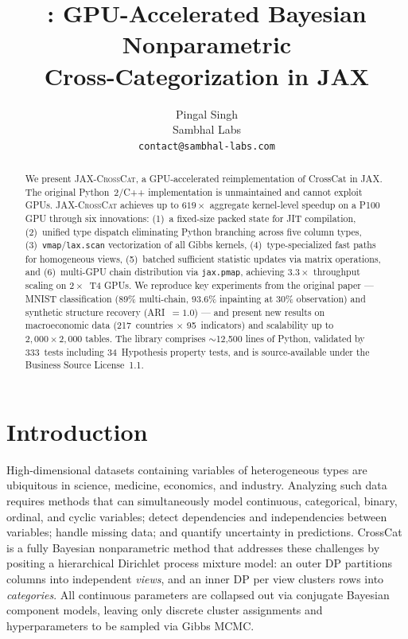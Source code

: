 \documentclass[11pt]{article}
\title{\jaxcc{}: GPU-Accelerated Bayesian Nonparametric\\Cross-Categorization in JAX}
\author{
  Pingal Singh \\
  Sambhal Labs \\
  \texttt{contact@sambhal-labs.com}
}
\date{}
\newcommand{\jaxcc}{\textsc{JAX-CrossCat}}
\begin{document}
\maketitle

\begin{abstract}
We present \jaxcc{}, a GPU-accelerated reimplementation of CrossCat
\citep{mansinghka2016crosscat} in JAX. The original Python~2/C++
implementation is unmaintained and cannot exploit GPUs. \jaxcc{} achieves
up to $619\times$ aggregate kernel-level speedup on a P100 GPU through
six innovations: (1)~a fixed-size packed state for JIT compilation,
(2)~unified type dispatch eliminating Python branching across five column
types, (3)~\texttt{vmap}/\texttt{lax.scan} vectorization of all Gibbs
kernels, (4)~type-specialized fast paths for homogeneous views,
(5)~batched sufficient statistic updates via matrix operations, and
(6)~multi-GPU chain distribution via \texttt{jax.pmap}, achieving
$3.3\times$ throughput scaling on $2\times$~T4 GPUs. We
reproduce key experiments from the original paper --- MNIST
classification (89\% multi-chain, 93.6\% inpainting at 30\% observation)
and synthetic structure recovery (ARI~$= 1.0$) --- and present new
results on macroeconomic data (217~countries $\times$ 95~indicators) and
scalability up to $2{,}000 \times 2{,}000$ tables. The library comprises
${\sim}$12,500 lines of Python, validated by 333~tests including
34~Hypothesis property tests, and is source-available under the Business
Source License~1.1.
\end{abstract}

\section{Introduction}
\label{sec:intro}

High-dimensional datasets containing variables of heterogeneous types
are ubiquitous in science, medicine, economics, and industry. Analyzing
such data requires methods that can simultaneously model continuous,
categorical, binary, ordinal, and cyclic variables; detect dependencies
and independencies between variables; handle missing data; and quantify
uncertainty in predictions. CrossCat \citep{mansinghka2016crosscat} is a
fully Bayesian nonparametric method that addresses these challenges by
positing a hierarchical Dirichlet process mixture model: an outer DP
partitions columns into independent \emph{views}, and an inner DP per
view clusters rows into \emph{categories}. All continuous parameters are
collapsed out via conjugate Bayesian component models, leaving only
discrete cluster assignments and hyperparameters to be sampled via Gibbs
MCMC.
\end{document}

